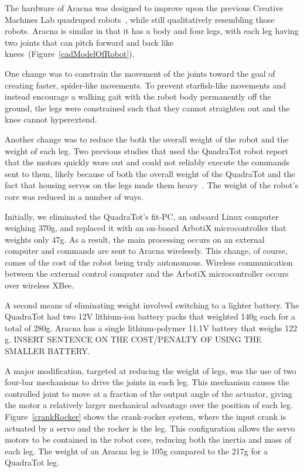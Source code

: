 \documentclass[letterpaper]{article}
\begin{document}

The hardware of Aracna was designed to improve upon the previous Creative Machines Lab
quadruped robots~\citep{bongard2006resilient, yosinski2011gaits}, while still qualitatively resembling those robots. Aracna is similar in that it has a body and four legs, with each leg having two joints that can pitch forward and back like knees~(Figure~\ref{cadModelOfRobot}). 

One change was to constrain the movement of the
joints toward the goal of creating faster, spider-like movements. To
prevent starfish-like movements and instead encourage a walking gait with the robot body permanently off the ground, the legs were constrained such that they cannot straighten out and the knee cannot hyperextend. 

Another change was to reduce the both the overall weight of the robot and the weight of each leg. Two previous studies that used the QuadraTot robot report that the motors quickly wore out and could not reliably execute the commands sent to them, likely because of both the overall weight of the QuadraTot and the fact that housing servos on the legs made them heavy~\citep{bongard2006resilient, yosinski2011gaits}. The weight of the robot's core was reduced in a number of ways. 

Initially, we eliminated the QuadraTot's fit-PC, an onboard Linux computer weighing 370g, and replaced it with an on-board ArbotiX microcontroller that weights only 47g. As a result, the main processing occurs on an external computer and commands are sent to Aracna wirelessly. This change, of course, comes of the cost of the robot being truly autonomous. Wireless communication between the external control computer
and the ArbotiX  microcontroller occurs over wireless XBee.

A second means of eliminating weight involved switching to a lighter battery. The QuadraTot had two 12V lithium-ion battery packs that weighted 140g each for a total of 280g. Aracna has a single lithium-polymer 11.1V battery that weighs 122 g. INSERT SENTENCE ON THE COST/PENALTY OF USING THE SMALLER BATTERY.   

A major modification, targeted at reducing the weight of legs, was the use of two four-bar mechanisms to drive the joints in each
leg. This mechanism causes the controlled joint to move at a fraction
of the output angle of the actuator, giving the motor a relatively
larger mechanical advantage over the position of each leg.
Figure~\ref{crankRocker} shows the crank-rocker system, where the input crank
is actuated by a servo and the rocker is the leg. This
configuration allows the servo motors to be contained in the robot core, reducing both the inertia and mass of each leg. The weight of an Aracna leg is 105g compared to the 217g for a QuadraTot leg.  
\end{document}
